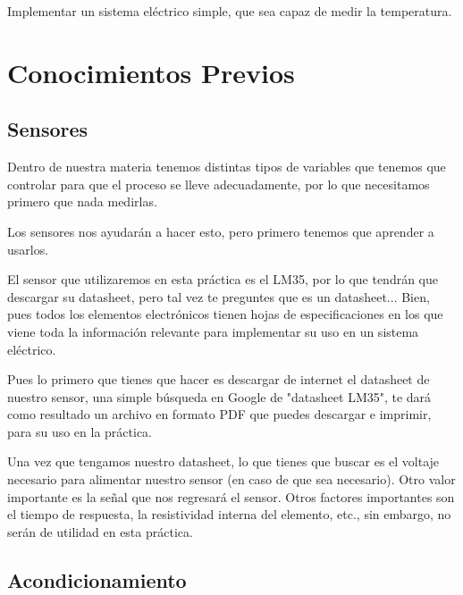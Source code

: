 	Implementar un sistema eléctrico simple, que sea capaz de medir la temperatura.


\section{Conocimientos Previos}


	\subsection{Sensores}

		Dentro de nuestra materia tenemos distintas tipos de variables que tenemos que controlar para que el proceso se lleve adecuadamente, por lo que necesitamos primero que nada medirlas.

		Los sensores nos ayudarán a hacer esto, pero primero tenemos que aprender a usarlos.

		El sensor que utilizaremos en esta práctica es el LM35, por lo que tendrán que descargar su datasheet, pero tal vez te preguntes que es un datasheet... Bien, pues todos los elementos electrónicos tienen hojas de especificaciones en los que viene toda la información relevante para implementar su uso en un sistema eléctrico.

		Pues lo primero que tienes que hacer es descargar de internet el datasheet de nuestro sensor, una simple búsqueda en Google de "datasheet LM35", te dará como resultado un archivo en formato PDF que puedes descargar e imprimir, para su uso en la práctica.

		Una vez que tengamos nuestro datasheet, lo que tienes que buscar es el voltaje necesario para alimentar nuestro sensor (en caso de que sea necesario). Otro valor importante es la señal que nos regresará el sensor. Otros factores importantes son el tiempo de respuesta, la resistividad interna del elemento, etc., sin embargo, no serán de utilidad en esta práctica.

	\subsection{Acondicionamiento}

